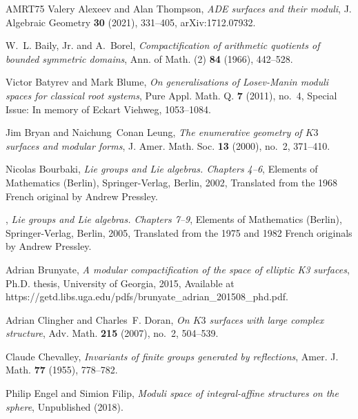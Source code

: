 \documentclass[table,x11names]{amsart}
\begin{document}
\begin{thebibliography}{AMRT75}
Valery Alexeev and Alan Thompson, \emph{{ADE} surfaces and their moduli}, J.
  Algebraic Geometry \textbf{30} (2021), 331--405, arXiv:1712.07932.

W.~L. Baily, Jr. and A.~Borel, \emph{Compactification of arithmetic quotients
  of bounded symmetric domains}, Ann. of Math. (2) \textbf{84} (1966),
  442--528. 
  
Victor Batyrev and Mark Blume, \emph{On generalisations of {L}osev-{M}anin
  moduli spaces for classical root systems}, Pure Appl. Math. Q. \textbf{7}
  (2011), no.~4, Special Issue: In memory of Eckart Viehweg, 1053--1084.

Jim Bryan and Naichung~Conan Leung, \emph{The enumerative geometry of {$K3$}
  surfaces and modular forms}, J. Amer. Math. Soc. \textbf{13} (2000), no.~2,
  371--410. 

Nicolas Bourbaki, \emph{Lie groups and {L}ie algebras. {C}hapters 4--6},
  Elements of Mathematics (Berlin), Springer-Verlag, Berlin, 2002, Translated
  from the 1968 French original by Andrew Pressley. 

\bysame, \emph{Lie groups and {L}ie algebras. {C}hapters 7--9}, Elements of
  Mathematics (Berlin), Springer-Verlag, Berlin, 2005, Translated from the 1975
  and 1982 French originals by Andrew Pressley. 

Adrian Brunyate, \emph{A modular compactification of the space of elliptic {K}3
  surfaces}, Ph.D. thesis, University of Georgia, 2015, Available at
  https://getd.libs.uga.edu/pdfs/brunyate\_adrian\_201508\_phd.pdf.

Adrian Clingher and Charles~F. Doran, \emph{On {$K3$} surfaces with large
  complex structure}, Adv. Math. \textbf{215} (2007), no.~2, 504--539.

Claude Chevalley, \emph{Invariants of finite groups generated by reflections},
  Amer. J. Math. \textbf{77} (1955), 778--782. 

Philip Engel and Simion Filip, \emph{Moduli space of integral-affine structures
  on the sphere}, Unpublished (2018).


\end{thebibliography}
\end{document}
